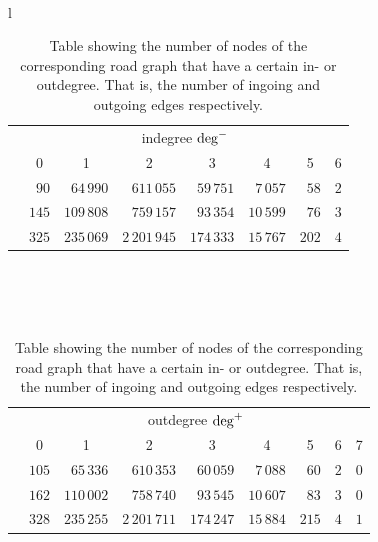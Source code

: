 	\begin{table}[ht]
	 	\begin{center}
	 		\phantom{v}\quad\\
	 		\begin{tabular}{l}
			\begin{tabular}{|l||r|r|r|r|r|r|r|}
				\hline
							&\multicolumn{7}{c|}{indegree $\operatorname{deg}^{-}$}\\
							&\multicolumn{1}{c|}{0}	&\multicolumn{1}{c|}{1}	&\multicolumn{1}{c|}{2}	&\multicolumn{1}{c|}{3}
								&\multicolumn{1}{c|}{4}	&\multicolumn{1}{c|}{5}	&\multicolumn{1}{c|}{6}\\\hline
				\freiburgR		&$90$		&$64\,990$		&$611\,055$		&$59\,751$		&$7\,057$	&$58$		&$2$\\
				\stuttgartR		&$145$	&$109\,808$		&$759\,157$		&$93\,354$		&$10\,599$	&$76$		&$3$\\
				\switzerlandR	&$325$	&$235\,069$		&$2\,201\,945$	&$174\,333$		&$15\,767$	&$202$	&$4$\\\hline
			\end{tabular}\\
			\quad\\
			\quad\\
			\begin{tabular}{|l||r|r|r|r|r|r|r|r|}
				\hline
							&\multicolumn{8}{c|}{outdegree $\operatorname{deg}^{+}$}\\
							&\multicolumn{1}{c|}{0}	&\multicolumn{1}{c|}{1}	&\multicolumn{1}{c|}{2}	&\multicolumn{1}{c|}{3}
								&\multicolumn{1}{c|}{4}	&\multicolumn{1}{c|}{5}	&\multicolumn{1}{c|}{6}	&\multicolumn{1}{c|}{7}\\\hline
				\freiburgR		&$105$	&$65\,336$		&$610\,353$		&$60\,059$		&$7\,088$	&$60$		&$2$	&$0$\\
				\stuttgartR		&$162$	&$110\,002$		&$758\,740$		&$93\,545$		&$10\,607$	&$83$		&$3$	&$0$\\
				\switzerlandR	&$328$	&$235\,255$		&$2\,201\,711$	&$174\,247$		&$15\,884$	&$215$	&$4$	&$1$\\\hline
			\end{tabular}
			\end{tabular}
		\end{center}
		\caption{Table showing the number of nodes of the corresponding road graph that have a certain in- or outdegree.
		That is, the number of ingoing and outgoing edges respectively.}
		\label{roadDegree}
	\end{table}

